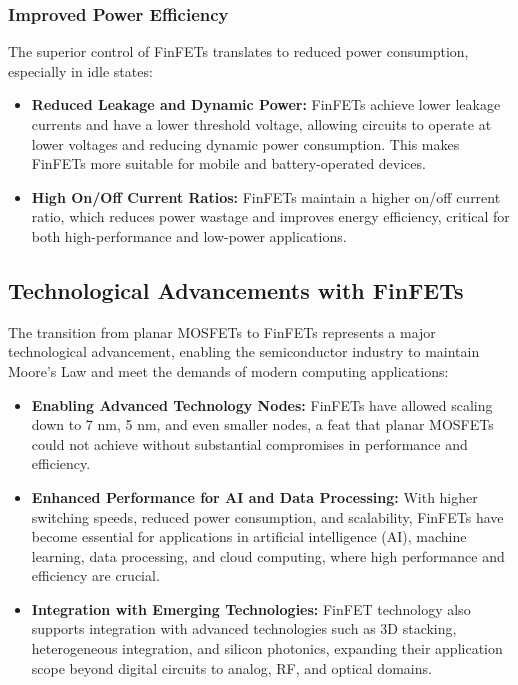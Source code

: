 \documentclass[12pt]{report}
\begin{document}
\begin{titlepage}
\subsubsection{Improved Power Efficiency}
The superior control of FinFETs translates to reduced power consumption, especially in idle states:
\begin{itemize}
    \item \textbf{Reduced Leakage and Dynamic Power:} FinFETs achieve lower leakage currents and have a lower threshold voltage, allowing circuits to operate at lower voltages and reducing dynamic power consumption. This makes FinFETs more suitable for mobile and battery-operated devices.
    \item \textbf{High On/Off Current Ratios:} FinFETs maintain a higher on/off current ratio, which reduces power wastage and improves energy efficiency, critical for both high-performance and low-power applications.
\end{itemize}

\subsection{Technological Advancements with FinFETs}
The transition from planar MOSFETs to FinFETs represents a major technological advancement, enabling the semiconductor industry to maintain Moore's Law and meet the demands of modern computing applications:
\begin{itemize}
    \item \textbf{Enabling Advanced Technology Nodes:} FinFETs have allowed scaling down to 7 nm, 5 nm, and even smaller nodes, a feat that planar MOSFETs could not achieve without substantial compromises in performance and efficiency.
    \item \textbf{Enhanced Performance for AI and Data Processing:} With higher switching speeds, reduced power consumption, and scalability, FinFETs have become essential for applications in artificial intelligence (AI), machine learning, data processing, and cloud computing, where high performance and efficiency are crucial.
    \item \textbf{Integration with Emerging Technologies:} FinFET technology also supports integration with advanced technologies such as 3D stacking, heterogeneous integration, and silicon photonics, expanding their application scope beyond digital circuits to analog, RF, and optical domains.
\end{itemize}


\end{titlepage}
\end{document}
